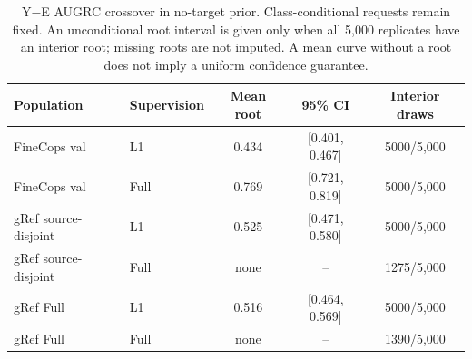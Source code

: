 \begin{table}[t]
\centering\footnotesize
\setlength{\tabcolsep}{3pt}
\renewcommand{\arraystretch}{1.15}
\caption{Y$-$E AUGRC crossover in no-target prior. Class-conditional requests remain fixed. An unconditional root interval is given only when all 5,000 replicates have an interior root; missing roots are not imputed. A mean curve without a root does not imply a uniform confidence guarantee.}\label{tab:coverage_roots}
\begin{tabular}{@{}llccc@{}}\toprule
Population & Supervision & Mean root & 95\% CI & Interior draws\\\midrule
FineCops val & L1 & 0.434 & [0.401, 0.467] & 5000/5,000\\
FineCops val & Full & 0.769 & [0.721, 0.819] & 5000/5,000\\
gRef source-disjoint & L1 & 0.525 & [0.471, 0.580] & 5000/5,000\\
gRef source-disjoint & Full & none & -- & 1275/5,000\\
gRef Full & L1 & 0.516 & [0.464, 0.569] & 5000/5,000\\
gRef Full & Full & none & -- & 1390/5,000\\
\bottomrule\end{tabular}
\end{table}
